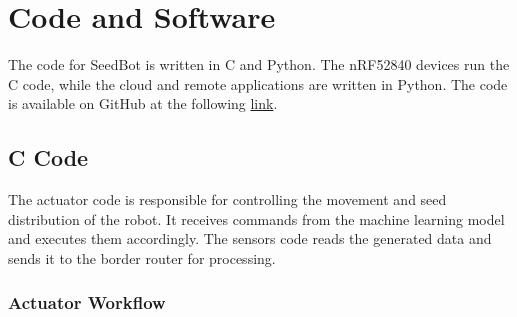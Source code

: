 \chapter{Code and Software}

The code for SeedBot is written in C and Python. The nRF52840 devices run the C code, while the cloud and remote applications are written in Python. The code is available on GitHub at the following \href {https://github.com/franocella/SeedBot_IoT}{link}.



\section{C Code}



The actuator code is responsible for controlling the movement and seed distribution of the robot. It receives commands from the machine learning model and executes them accordingly.
The sensors code reads the generated data and sends it to the border router for processing.


\subsection{Actuator Workflow}

